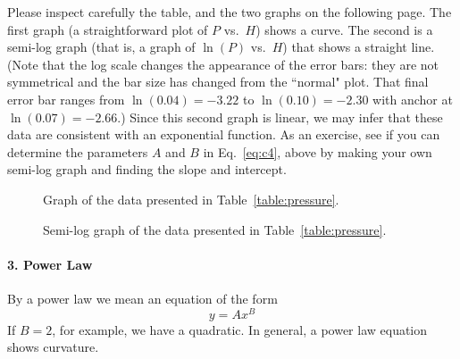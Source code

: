 Please inspect carefully the table, and the two graphs on the following
page.  The first graph (a straightforward plot of $P$ vs.\ $H$)
shows a curve.  The second is a semi-log graph (that
is, a graph of $\ln(P)$ vs.\ $H$) that shows a straight line.  
(Note that the log scale
changes the appearance of the error bars: they are not symmetrical
and the bar size has changed from the ``normal" plot. That final error bar
ranges from $\ln(0.04)=-3.22$ to $\ln(0.10)=-2.30$ with anchor at $\ln(0.07)=-2.66$.)  
Since this second
graph is linear, we may infer that these data are consistent with an
exponential function.  As an exercise, see if you can determine the
parameters $A$ and $B$ in Eq.~\ref{eq:c4}, above by making your own
semi-log graph and finding the slope and intercept.

\newpage

\begin{figure}[!hbt]    %
\begin{center}
{}
\end{center}
\caption{Graph of the data presented in Table~\protect\ref{table:pressure}.
          \label{fig:pressure}}
\end{figure}

\begin{figure}[!hbt]   %
\begin{center}
{}
\end{center}
\caption{Semi-log graph of the data presented in Table~\protect\ref{table:pressure}.
          \label{fig:pressure_log}}
\end{figure}



\paragraph*{3. Power Law}


    By a power law we mean an equation of the form
\begin{equation}
y = Ax^{B}  \label{eq:c3}
\end{equation}
If $B = 2$, for example, we have a quadratic.
In general, a power law equation shows curvature.

